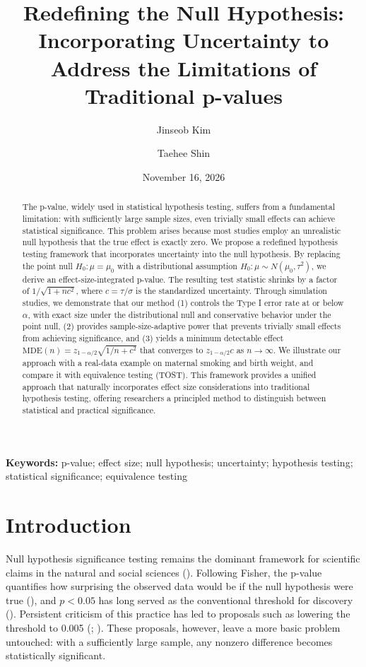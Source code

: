\documentclass[
  11pt,
  letterpaper,
]{article}
\author[1,*]{Jinseob Kim}
\author[1,2]{Taehee Shin}
\affil[1]{Zarathu Co., Ltd., Seoul, South Korea}
\affil[2]{Department of Applied Statistics, Yonsei University, Seoul, South Korea}
\affil[*]{Corresponding author: \protect\href{mailto:jinseob2kim@gmail.com}{jinseob2kim@gmail.com}}
\title{Redefining the Null Hypothesis: Incorporating Uncertainty to
Address the Limitations of Traditional p-values}
\author{}
\date{November 16, 2026}
\begin{document}
\maketitle
\begin{abstract}
The p-value, widely used in statistical hypothesis testing, suffers from
a fundamental limitation: with sufficiently large sample sizes, even
trivially small effects can achieve statistical significance. This
problem arises because most studies employ an unrealistic null
hypothesis that the true effect is exactly zero. We propose a redefined
hypothesis testing framework that incorporates uncertainty into the null
hypothesis. By replacing the point null \(H_0: \mu = \mu_0\) with a
distributional assumption \(H_0: \mu \sim N(\mu_0, \tau^2)\), we derive
an effect-size-integrated p-value. The resulting test statistic shrinks
by a factor of \(1/\sqrt{1+nc^2}\), where \(c = \tau/\sigma\) is the
standardized uncertainty. Through simulation studies, we demonstrate
that our method (1) controls the Type I error rate at or below
\(\alpha\), with exact size under the distributional null and
conservative behavior under the point null, (2) provides
sample-size-adaptive power that prevents trivially small effects from
achieving significance, and (3) yields a minimum detectable effect
\(\mathrm{MDE}(n) = z_{1-\alpha/2}\sqrt{1/n + c^2}\) that converges to
\(z_{1-\alpha/2} c\) as \(n \to \infty\). We illustrate our approach
with a real-data example on maternal smoking and birth weight, and
compare it with equivalence testing (TOST). This framework provides a
unified approach that naturally incorporates effect size considerations
into traditional hypothesis testing, offering researchers a principled
method to distinguish between statistical and practical significance.
\end{abstract}

\noindent\textbf{Keywords:} p-value; effect size; null hypothesis; uncertainty; hypothesis testing; statistical significance; equivalence testing
\bigskip


\section{Introduction}\label{sec-intro}

Null hypothesis significance testing remains the dominant framework for
scientific claims in the natural and social sciences
(). Following
Fisher, the p-value quantifies how surprising the observed data would be
if the null hypothesis were true (),
and \(p < 0.05\) has long served as the conventional threshold for
discovery ().
Persistent criticism of this practice has led to proposals such as
lowering the threshold to 0.005 (; ). These
proposals, however, leave a more basic problem untouched: with a
sufficiently large sample, any nonzero difference becomes statistically
significant.
\end{document}
